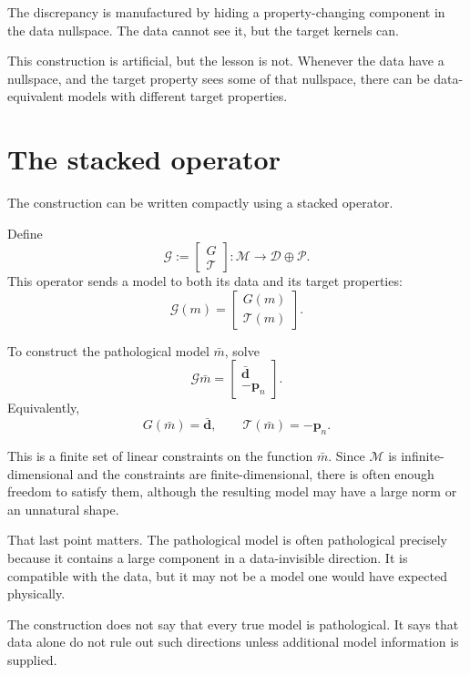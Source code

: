 \documentclass[11pt,openany]{book}
\theoremstyle{definition}
\theoremstyle{remark}
\newcommand{\M}{\mathcal M}
\newcommand{\D}{\mathcal D}
\newcommand{\Pspace}{\mathcal P}
\newcommand{\Tau}{\mathcal{T}}
\begin{document}
\begin{intuitionbox}
The discrepancy is manufactured by hiding a property-changing component in the data nullspace.
The data cannot see it, but the target kernels can.
\end{intuitionbox}

This construction is artificial, but the lesson is not. Whenever the data have a nullspace, and
the target property sees some of that nullspace, there can be data-equivalent models with
different target properties.

\section{The stacked operator}

The construction can be written compactly using a stacked operator.

Define
\[
  \mathcal G
  :=
  \begin{bmatrix}
    G\\
    \Tau
  \end{bmatrix}
  :
  \M\to \D\oplus\Pspace.
\]
This operator sends a model to both its data and its target properties:
\[
  \mathcal G(m)
  =
  \begin{bmatrix}
    G(m)\\
    \Tau(m)
  \end{bmatrix}.
\]

To construct the pathological model \(\bar m\), solve
\[
  \mathcal G\bar m
  =
  \begin{bmatrix}
    \bar{\mathbf d}\\
    -\mathbf p_n
  \end{bmatrix}.
\]
Equivalently,
\[
  G(\bar m)=\bar{\mathbf d},
  \qquad
  \Tau(\bar m)=-\mathbf p_n.
\]

This is a finite set of linear constraints on the function \(\bar m\). Since \(\M\) is
infinite-dimensional and the constraints are finite-dimensional, there is often enough freedom
to satisfy them, although the resulting model may have a large norm or an unnatural shape.

That last point matters. The pathological model is often pathological precisely because it
contains a large component in a data-invisible direction. It is compatible with the data, but it
may not be a model one would have expected physically.

\begin{warningbox}
The construction does not say that every true model is pathological. It says that data alone do
not rule out such directions unless additional model information is supplied.
\end{warningbox}
\end{document}
